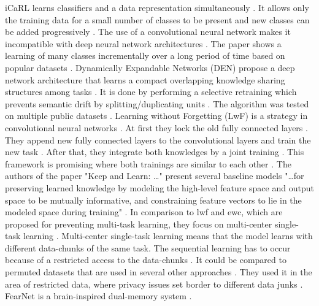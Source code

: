 iCaRL learns classifiers and a data representation simultaneously \cite{iCARL}.
It allows only the training data for a small number of classes to be present and new classes can be added progressively \cite{iCARL}.
The use of a convolutional neural network makes it incompatible with deep neural network architectures \cite{iCARL}.
The paper shows a learning of many classes incrementally over a long period of time based on popular datasets \cite{iCARL}.
\newline
Dynamically Expandable Networks (DEN) propose a deep network architecture that learns a compact overlapping knowledge sharing structures among tasks \cite{DEN}.
It is done by performing a selective retraining which prevents semantic drift by splitting/duplicating units \cite{DEN}.
The algorithm was tested on multiple public datasets \cite{DEN}.
\newline
Learning without Forgetting (LwF) is a strategy in convolutional neural networks \cite{LwF}.
At first they lock the old fully connected layers \cite{LwF}.
They append new fully connected layers to the convolutional layers and train the new task \cite{LwF}.
After that, they integrate both knowledges by a joint training \cite{LwF}.
This framework is promising where both trainings are similar to each other \cite{incremental-moment-matching, LwF}.
\newline
The authors of the paper "Keep and Learn: …" \cite{Keep_and_Learn} present several baseline models "…for preserving learned knowledge by modeling the high-level feature space and output space to be mutually informative, and constraining feature vectors to lie in the modeled space during training" \cite{Keep_and_Learn}.
In comparison to \acrshort{lwf} and \acrshort{ewc}, which are proposed for preventing multi-task learning, they focus on multi-center single-task learning \cite{Keep_and_Learn}.
Multi-center single-task learning means that the model learns with different data-chunks of the same task.
The sequential learning has to occur because of a restricted access to the data-chunks \cite{Keep_and_Learn}.
It could be compared to permuted datasets that are used in several other approaches \cite{Keep_and_Learn}.
They used it in the area of restricted data, where privacy issues set border to different data junks \cite{Keep_and_Learn}.
\newline
FearNet is a brain-inspired dual-memory system \cite{FearNet}.

